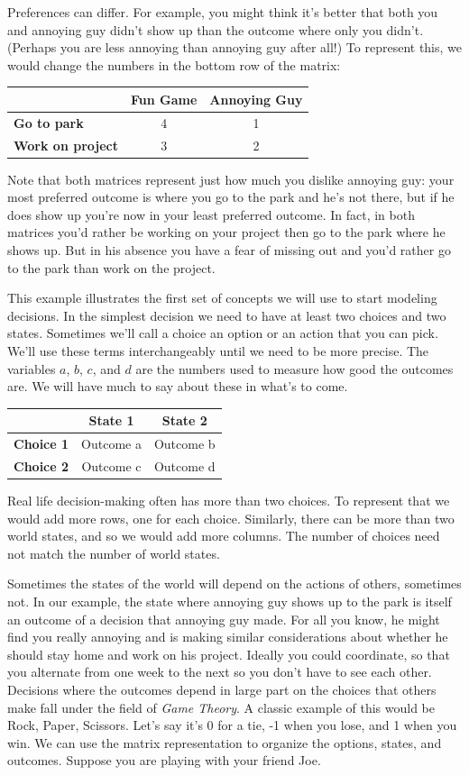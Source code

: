 \documentclass[]{tufte-book}
\begin{document}
Preferences can differ. For example, you might think it's better that both you and annoying guy didn't show up than the outcome where only you didn't. (Perhaps you are less annoying than annoying guy after all!) To represent this, we would change the numbers in the bottom row of the matrix:

\begin{longtable}[]{@{}lcc@{}}
\toprule
& Fun Game & Annoying Guy\tabularnewline
\midrule
\endhead
\textbf{Go to park} & 4 & 1\tabularnewline
\textbf{Work on project} & 3 & 2\tabularnewline
\bottomrule
\end{longtable}

Note that both matrices represent just how much you dislike annoying guy: your most preferred outcome is where you go to the park and he's not there, but if he does show up you're now in your least preferred outcome. In fact, in both matrices you'd rather be working on your project then go to the park where he shows up. But in his absence you have a fear of missing out and you'd rather go to the park than work on the project.

This example illustrates the first set of concepts we will use to start modeling decisions. In the simplest decision we need to have at least two choices and two states. Sometimes we'll call a choice an option or an action that you can pick. We'll use these terms interchangeably until we need to be more precise. The variables \(a\), \(b\), \(c\), and \(d\) are the numbers used to measure how good the outcomes are. We will have much to say about these in what's to come.

\begin{longtable}[]{@{}lcc@{}}
\toprule
& State 1 & State 2\tabularnewline
\midrule
\endhead
\textbf{Choice 1} & Outcome a & Outcome b\tabularnewline
\textbf{Choice 2} & Outcome c & Outcome d\tabularnewline
\bottomrule
\end{longtable}

Real life decision-making often has more than two choices. To represent that we would add more rows, one for each choice. Similarly, there can be more than two world states, and so we would add more columns. The number of choices need not match the number of world states.

Sometimes the states of the world will depend on the actions of others, sometimes not. In our example, the state where annoying guy shows up to the park is itself an outcome of a decision that annoying guy made. For all you know, he might find you really annoying and is making similar considerations about whether he should stay home and work on his project. Ideally you could coordinate, so that you alternate from one week to the next so you don't have to see each other. Decisions where the outcomes depend in large part on the choices that others make fall under the field of \emph{Game Theory}. A classic example of this would be Rock, Paper, Scissors. Let's say it's 0 for a tie, -1 when you lose, and 1 when you win. We can use the matrix representation to organize the options, states, and outcomes. Suppose you are playing with your friend Joe.
\end{document}
